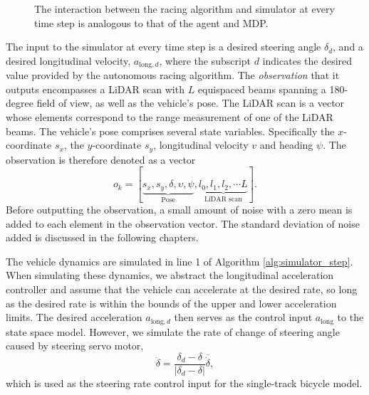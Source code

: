 \begin{figure}[htb!]
    \centering
    
    \caption[The interaction between the ]{The interaction between the racing algorithm and simulator at every time step is analogous to that of the agent and MDP.}
    \label{fig:sim_mdp}
\end{figure}



The input to the simulator at every time step is a desired steering angle $\delta_d$, and a desired longitudinal velocity, $a_{\text{long},d}$, where the subscript $d$ indicates the desired value provided by the autonomous racing algorithm.
The \emph{observation} that it outputs encompasses a LiDAR scan with $L$ equispaced beams spanning a 180-degree field of view, as well as the vehicle's pose.
The LiDAR scan is a vector whose elements correspond to the range measurement of one of the LiDAR beams.
The vehicle's pose comprises several state variables.
Specifically the $x$-coordinate $s_x$, the $y$-coordinate $s_y$, longitudinal velocity $v$ and heading $\psi$.
The observation is therefore denoted as a vector
\begin{equation}
    o_k = [\underbrace{s_{x}, s_{y}, {\delta}, {\upsilon}, \psi}_{\text{Pose}}, \underbrace{l_0, l_1, l_2, \cdots L}_{\text{LiDAR scan}}].
\end{equation}
Before outputting the observation, a small amount of noise with a zero mean is added to each element in the observation vector.
The standard deviation of noise added is discussed in the following chapters.




The vehicle dynamics are simulated in line 1 of Algorithm \ref{alg:simulator_step}.
When simulating these dynamics, we abstract the longitudinal acceleration controller and assume that the vehicle can accelerate at the desired rate, 
so long as the desired rate is within the bounds of the upper and lower acceleration limits.
The desired acceleration $a_{\text{long},d}$ then serves as the control input $a_{\text{long}}$ to the state space model. 
However, we simulate the rate of change of steering angle caused by steering servo motor,
\begin{equation}
    \dot{\delta} = \frac{\delta_d - \delta}{|\delta_d - \delta|} \overline{\dot{\delta}},
\label{eq:sim_servo}
\end{equation}
which is used as the steering rate control input for the single-track bicycle model.

